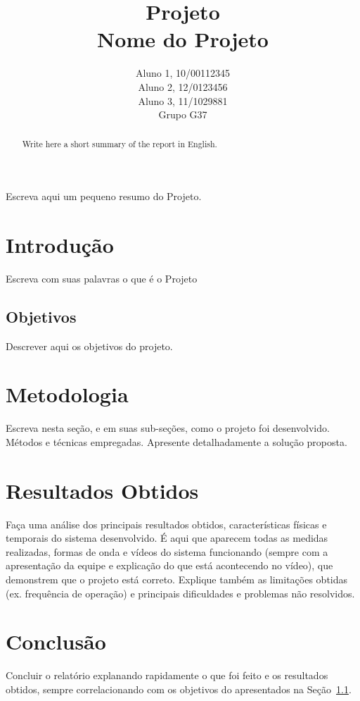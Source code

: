 \documentclass[12pt]{article}
\title{Projeto\\ 
Nome do Projeto}
\author{Aluno 1, 10/00112345\\
        Aluno 2,  12/0123456\\
        Aluno 3, 11/1029881\\
        Grupo G37
}
\begin{document}
 
\maketitle

 \begin{abstract}
   Write here a short summary of the report in English.
 \end{abstract}
    
 \begin{resumo} 
  Escreva aqui um pequeno resumo do Projeto.
 \end{resumo}


\section{Introdução}
\label{sec:Introducao}

Escreva com suas palavras o que é o Projeto

\subsection{Objetivos}
\label{sec:Objetivos}

Descrever aqui os objetivos do projeto.

\section{Metodologia}
\label{sec:Metodologia}

Escreva nesta seção, e em suas sub-seções, como o projeto foi desenvolvido. Métodos e técnicas empregadas. 
Apresente detalhadamente a solução proposta.

\section{Resultados Obtidos}
\label{sec:Resultados}

Faça uma análise dos principais resultados obtidos, características físicas e temporais do sistema desenvolvido.
É aqui que aparecem todas as medidas realizadas, formas de onda e vídeos do sistema funcionando (sempre com a apresentação da equipe e explicação do que está acontecendo no vídeo), que demonstrem que o projeto está correto.
Explique também as limitações obtidas (ex. frequência de operação) e principais dificuldades e problemas não resolvidos.

\section{Conclusão}
\label{sec:Conclusao}

Concluir o relatório explanando rapidamente o que foi feito e os resultados obtidos, sempre correlacionando com os objetivos do apresentados na Seção~\ref{sec:Objetivos}. 



\end{document}

